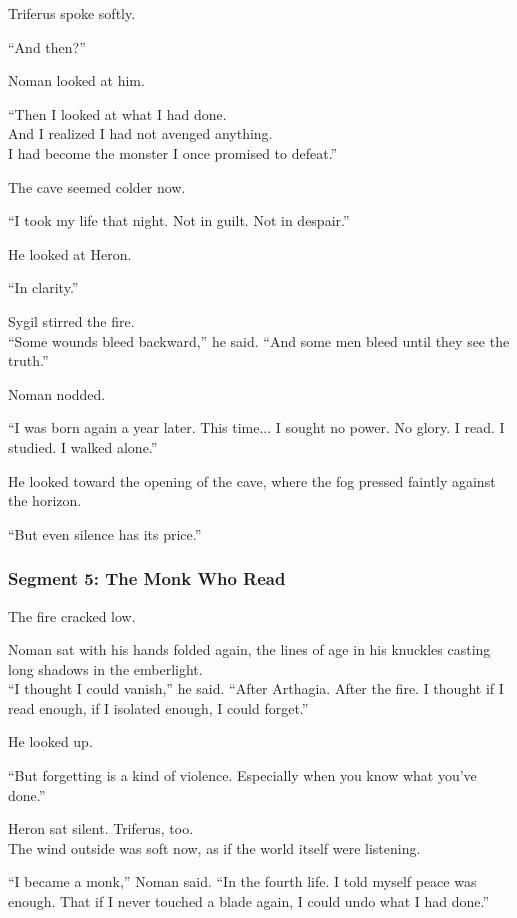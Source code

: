 \documentclass[9pt]{article}
\begin{document}
Triferus spoke softly.

“And then?”

Noman looked at him.

“Then I looked at what I had done.\\
And I realized I had not avenged anything.\\
I had become the monster I once promised to defeat.”

The cave seemed colder now.

“I took my life that night. Not in guilt. Not in despair.”

He looked at Heron.

“In clarity.”

\vspace{1em}

Sygil stirred the fire.\\
“Some wounds bleed backward,” he said. “And some men bleed until they see the truth.”

Noman nodded.

“I was born again a year later. This time... I sought no power. No glory. I read. I studied. I walked alone.”

He looked toward the opening of the cave, where the fog pressed faintly against the horizon.

“But even silence has its price.”

\newpage

\subsubsection*{Segment 5: The Monk Who Read}

The fire cracked low.

Noman sat with his hands folded again, the lines of age in his knuckles casting long shadows in the emberlight.\\
“I thought I could vanish,” he said. “After Arthagia. After the fire. I thought if I read enough, if I isolated enough, I could forget.”

He looked up.

“But forgetting is a kind of violence. Especially when you know what you’ve done.”

\vspace{1em}

Heron sat silent. Triferus, too.\\
The wind outside was soft now, as if the world itself were listening.

“I became a monk,” Noman said. “In the fourth life. I told myself peace was enough. That if I never touched a blade again, I could undo what I had done.”
\end{document}
